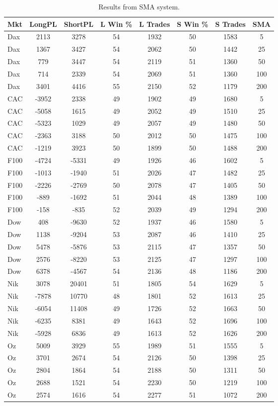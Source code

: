 \begin{table}[ht]
\centering
\caption[SMA Base System]{Results from SMA system.} 
\label{tab:sma_results}
\begin{tabular}{lccccccc}
  \toprule Mkt & LongPL & ShortPL & L Win \% & L Trades & S Win \% & S Trades & SMA \\ 
  \midrule Dax & 2113 & 3278 & 54 & 1932 & 50 & 1583 & 5 \\ 
  Dax & 1367 & 3427 & 54 & 2062 & 50 & 1442 & 25 \\ 
  Dax & 779 & 3447 & 54 & 2119 & 51 & 1360 & 50 \\ 
  Dax & 714 & 2339 & 54 & 2069 & 51 & 1360 & 100 \\ 
  Dax & 3401 & 4416 & 55 & 2150 & 52 & 1179 & 200 \\ 
  CAC & -3952 & 2338 & 49 & 1902 & 49 & 1680 & 5 \\ 
  CAC & -5058 & 1615 & 49 & 2052 & 49 & 1510 & 25 \\ 
  CAC & -5323 & 1029 & 49 & 2057 & 49 & 1480 & 50 \\ 
  CAC & -2363 & 3188 & 50 & 2012 & 50 & 1475 & 100 \\ 
  CAC & -1219 & 3923 & 50 & 1899 & 50 & 1488 & 200 \\ 
  F100 & -4724 & -5331 & 49 & 1926 & 46 & 1602 & 5 \\ 
  F100 & -1013 & -1940 & 51 & 2026 & 47 & 1482 & 25 \\ 
  F100 & -2226 & -2769 & 50 & 2078 & 47 & 1405 & 50 \\ 
  F100 & -889 & -1692 & 51 & 2044 & 48 & 1389 & 100 \\ 
  F100 & -158 & -835 & 52 & 2039 & 49 & 1294 & 200 \\ 
  Dow & 408 & -9630 & 52 & 1937 & 46 & 1580 & 5 \\ 
  Dow & 1138 & -9204 & 53 & 2087 & 46 & 1410 & 25 \\ 
  Dow & 5478 & -5876 & 53 & 2115 & 47 & 1357 & 50 \\ 
  Dow & 2576 & -8220 & 53 & 2125 & 47 & 1297 & 100 \\ 
  Dow & 6378 & -4567 & 54 & 2136 & 48 & 1186 & 200 \\ 
  Nik & 3078 & 20401 & 51 & 1805 & 54 & 1629 & 5 \\ 
  Nik & -7878 & 10770 & 48 & 1801 & 52 & 1613 & 25 \\ 
  Nik & -6054 & 11408 & 49 & 1726 & 52 & 1663 & 50 \\ 
  Nik & -6235 & 8381 & 49 & 1643 & 52 & 1696 & 100 \\ 
  Nik & -5928 & 6836 & 49 & 1613 & 52 & 1626 & 200 \\ 
  Oz & 5009 & 3929 & 55 & 1989 & 51 & 1555 & 5 \\ 
  Oz & 3701 & 2674 & 54 & 2126 & 50 & 1398 & 25 \\ 
  Oz & 2804 & 1864 & 54 & 2188 & 50 & 1311 & 50 \\ 
  Oz & 2688 & 1521 & 54 & 2230 & 50 & 1219 & 100 \\ 
  Oz & 2574 & 1616 & 54 & 2277 & 51 & 1072 & 200 \\ 
   \bottomrule \end{tabular}
\end{table}
